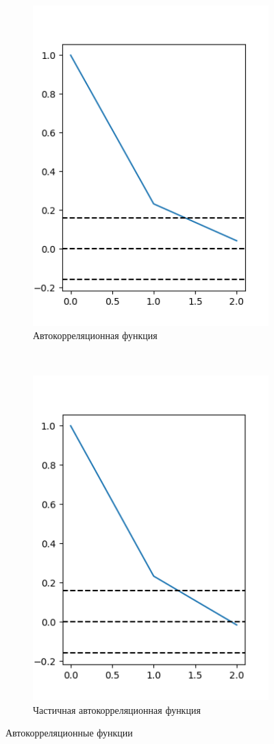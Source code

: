 \begin{figure}[H]
    \centering
    \begin{subfigure}[t]{0.5\linewidth}
        \centering
        \includegraphics{series_week_log_diff_acf}
        \caption{Автокорреляционная функция}
    \end{subfigure}%
    ~ 
    \begin{subfigure}[t]{0.5\linewidth}
        \centering
        \includegraphics{series_week_log_diff_pacf}
        \caption{Частичная автокорреляционная функция}
    \end{subfigure}
    \caption{Автокорреляционные функции}
    \label{fig:series_week_log_diff_acf}
\end{figure}


